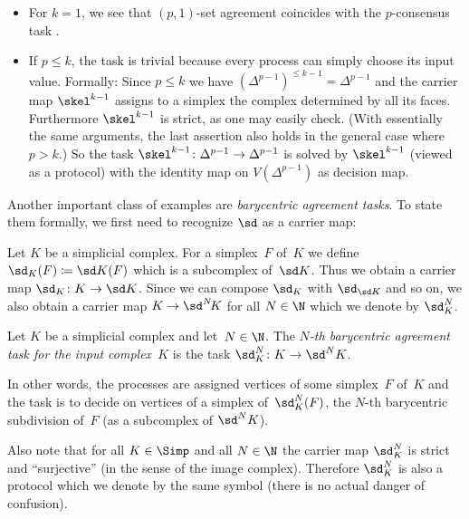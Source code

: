 \begin{thExample}
\begin{itemize}
        \item
            For $k=1$, we see that $(p,1)$-set agreement coincides with
            the $p$-consensus task .
            
        \item
            If $p\leq k$, the task is trivial because every process can simply
            choose its input value. Formally: Since $p\leq k$ we have
            $(\Delta^{p-1})^{\leq k-1} = \Delta^{p-1}$ and the carrier map
            $\skel^{k-1}$ assigns to a simplex the complex determined by all its
            faces. Furthermore $\skel^{k-1}$ is strict, as one may easily check.
            (With essentially the same arguments, the last assertion also holds
            in the general case where $p > k$.) So the task
            $\skel^{k-1}\colon\Delta^{p-1}\to\Delta^{p-1}$ is solved by
            $\skel^{k-1}$ (viewed as a protocol) with the identity map
            on $V(\Delta^{p-1})$ as decision map.
    \end{itemize}
\end{thExample}

Another important class of examples are \emph{barycentric agreement tasks}. To
state them formally, we first need to recognize $\sd$ 
as a carrier map:

\vfill %

\pagebreak[2]\noindent
Let $K$ be a simplicial complex. For a simplex~$F$ of~$K$ we define
$\sd_K(F) \defeq \sd K(F)$ which is a subcomplex of~$\sd K$. Thus we
obtain a carrier map $\sd_K\colon K\to\sd K$. Since we can compose
$\sd_K$ with $\sd_{\sd K}$ and so on, we also obtain a carrier map
$K\to\sd^N\!K$ for all $N\in\N$ which we denote by $\sd_K^N$.

\begin{thExample}
    \label{ch2:barycentricagreement}
    \;Let $K$ be a simplicial complex and let~$N\in\N$. The
    \emph{$N$-th barycentric agreement task for the input complex~$K$}
    is the task $\sd_K^N\colon K\to\sd^N K$.
    
    In other words, the processes are assigned vertices of some simplex~$F$
    of~$K$ and the task is to decide on vertices of a simplex
    of~$\sd_K^N(F)$, the $N$-th barycentric subdivision of~$F$
    (as a subcomplex of $\sd^N K$).
\end{thExample}

Also note that for all $K\in\Simp$ and all $N\in\N$ the carrier map
$\sd_K^N$ is strict and \enquote{surjective} (in the sense of the image
complex). Therefore $\sd_K^N$ is also a protocol which we denote by
the same symbol (there is no actual danger of confusion).


